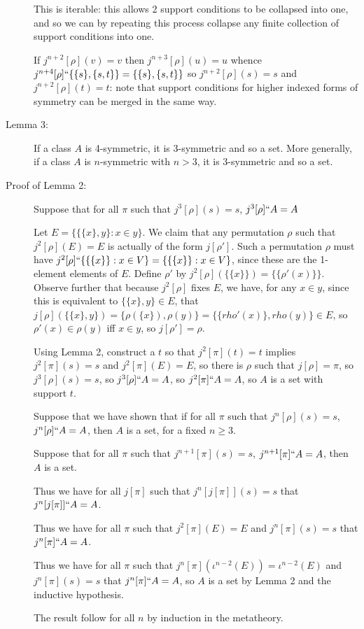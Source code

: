 \documentclass[12pt]{article}
\begin{document}
\begin{description}
This is iterable:  this allows 2 support conditions to be collapsed into one, and so we can by repeating this process collapse any finite collection of support conditions into one.

If $j^{n+2}[\rho](v)=v$ then $j^{n+3}[\rho](u) = u$ whence $j^{n+4}[\rho]``\{\{s\},\{s,t\}\}= \{\{s\},\{s,t\}\}$ so $j^{n+2}[\rho](s)=s$ and $j^{n+2}[\rho](t)=t$:  note that support conditions for higher indexed forms of symmetry can be merged in the same way.

\item[Lemma 3:]  If a class $A$ is 4-symmetric, it is 3-symmetric and so a set.  More generally, if a class $A$ is $n$-symmetric with $n>3$, it is 3-symmetric and so a set.

\item[Proof of Lemma 2:]  Suppose that for all $\pi$ such that $j^3[\rho](s)=s$, $j^3[\rho]``A =A$

Let $E = \{\{\{x\},y\}:x \in y\}$.  We claim that any permutation $\rho$ such that $j^2[\rho](E)=E$ is actually of the form $j[\rho']$.
Such a permutation $\rho$ must have $j^2[\rho]``\{\{\{x\}\}:x \in V\}= \{\{\{x\}\}:x \in V\}$, since these are the 1-element elements of $E$.
Define $\rho'$ by $j^2[\rho](\{\{x\}\}) = \{\{\rho'(x)\}\}$.  Observe further that because $j^2[\rho]$ fixes $E$, we have, for any $x \in y$, since this is equivalent to $\{\{x\},y\} \in E$,
that $j[\rho](\{\{x\},y\}) = \{\rho(\{x\}),\rho(y)\} = \{\{rho'(x)\},rho(y)\} \in E$, so $\rho'(x) \in \rho(y)$ iff $x \in y$, so $j[\rho']=\rho$.

Using Lemma 2, construct a $t$ so that $j^2[\pi](t)=t$ implies $j^2[\pi](s)=s$ and $j^2[\pi](E)=E$, so there is $\rho$ such
that $j[\rho]=\pi$, so  $j^3[\rho](s)=s$, so $j^3[\rho]``A =A$, so $j^2[\pi]``A=A$, so $A$ is a set with support $t$.

Suppose that we have shown that if for all $\pi$ such that $j^n[\rho](s)=s$, $j^n[\rho]``A =A$, then $A$ is a set, for a fixed $n \geq 3$.

Suppose that for all $\pi$ such that $j^{n+1}[\pi](s)=s$, $j^{n+1}[\pi]``A =A$, then $A$ is a set.

Thus we have for all $j[\pi]$ such that $j^n[j[\pi]](s) = s$ that $j^n[j[\pi]]``A = A$.

Thus we have for all $\pi$ such that $j^2[\pi](E) = E$ and $j^n[\pi](s)=s$ that $ j^n[\pi]``A = A$.

Thus we have for all $\pi$ such that $j^n[\pi](\iota^{n-2}(E)) = \iota^{n-2}(E)$ and $j^n[\pi](s)=s$ that  $ j^n[\pi]``A = A$, so $A$ is a set by Lemma 2 and the inductive hypothesis.

The result follow for all $n$ by induction in the metatheory.



\end{description}
\end{document}
